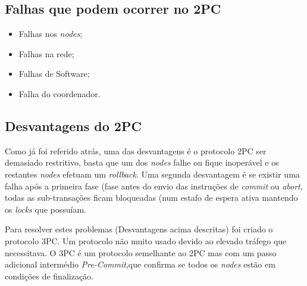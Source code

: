 \subsection{Falhas que podem ocorrer no 2PC}
\begin{itemize}
    \item Falhas nos \textit{nodes};
    \item Falhas na rede;
    \item Falhas de Software;
    \item Falha do coordenador.
\end{itemize}

\subsection{Desvantagens do 2PC}
Como já foi referido atrás, uma das desvantagens é o protocolo \ac{2PC} ser demasiado restritivo, basta que um dos \textit{nodes} falhe ou fique inoperável e os restantes \textit{nodes} efetuam um \textit{rollback}. Uma segunda desvantagem é se existir uma falha após a primeira fase (fase antes do envio das instruções de \textit{commit} ou \textit{abort}, todas as sub-transações ficam bloqueadas (num estafo de espera ativa mantendo os \textit{locks} que possuíam.

Para resolver estes problemas (Desvantagens acima descritas) foi criado o protocolo \ac{3PC}. Um protocolo não muito usado devido ao elevado tráfego que necessitava. O \ac{3PC} é um protocolo semelhante ao \ac{2PC} mas com um passo adicional intermédio \textit{Pre-Commit},que confirma se todos os \textit{nodes} estão em condições de finalização.
